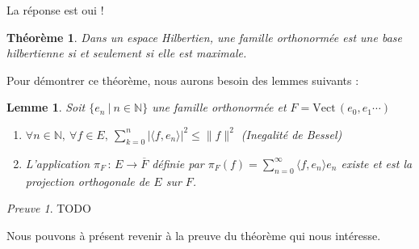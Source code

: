 \documentclass[]{article}
\newtheorem{mythm}{Théorème}
\newtheorem{mylemma}{Lemme}
\theoremstyle{remark}
\newtheorem{myproof}{Preuve}
\theoremstyle{definition}
\newcommand{\funcshort}[3]{
	#1 \, : \, #2 \longrightarrow #3
}
\newcommand{\vect}{\text{Vect}}
\newcommand{\DS}{\displaystyle}
\begin{document}
	La réponse est oui !
	
	\begin{mythm}
		Dans un espace Hilbertien, une famille orthonormée est une base hilbertienne si et seulement si elle est maximale.
	\end{mythm}
	
	Pour démontrer ce théorème, nous aurons besoin des lemmes suivants :
	
	\begin{mylemma}
		Soit $\{e_n ~ | ~ n \in \mathbb{N}\}$ une famille orthonormée et $F = \vect \, (e_0, e_1 \cdots)$
		\begin{enumerate}
			\item $\forall n \in \mathbb{N}, ~ \forall f \in E, ~ \sum_{k = 0}^{n} |\langle f, e_n \rangle|^2 \leqslant \|f\|^2$ (Inegalité de Bessel)
			\item L'application $\funcshort{\pi_F}{E}{\overline{F}}$ définie par $\DS \pi_F(f) = \sum_{n = 0}^\infty \langle f, e_n \rangle e_n$ existe et est la projection orthogonale de $E$ sur $F$.
		\end{enumerate}
	\end{mylemma}
	
	\begin{myproof}
		TODO
	\end{myproof}
	
	Nous pouvons à présent revenir à la preuve du théorème qui nous intéresse.
	
\end{document}

